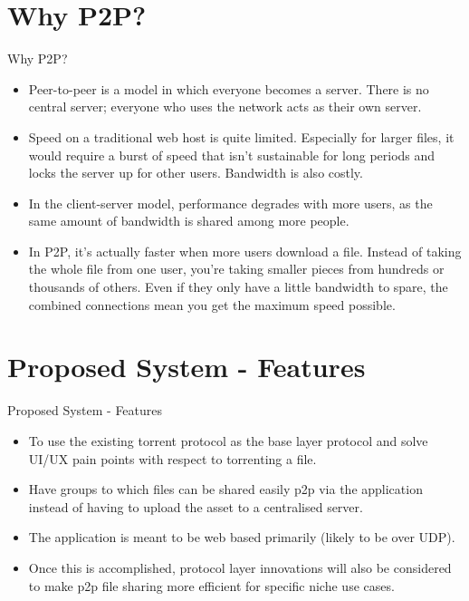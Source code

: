\documentclass[9pt]{beamer}
\begin{document}
\section{Why P2P?}
\begin{frame}{Why P2P?}
 \begin{itemize}
     \item Peer-to-peer is a model in which everyone becomes a server. There is no central server; everyone who uses the network acts as their own server. \item Speed on a traditional web host is quite limited. Especially for larger files, it would require a burst of speed that isn't sustainable for long periods and locks the server up for other users. Bandwidth is also costly. 
     \item In the client-server model, performance degrades with more users, as the same amount of bandwidth is shared among more people.
     \item In P2P, it's actually faster when more users download a file. Instead of taking the whole file from one user, you're taking smaller pieces from hundreds or thousands of others. Even if they only have a little bandwidth to spare, the combined connections mean you get the maximum speed possible. 
 \end{itemize}
    
\end{frame}


\section{Proposed System - Features }
\begin{frame}{Proposed System - Features }
 \begin{itemize}
     \item To use the existing torrent protocol as the base layer protocol and solve UI/UX pain points with respect to torrenting a file. 
     \item Have groups to which files can be shared easily p2p via the application instead of having to upload the asset to a centralised server.
     \item The application is meant to be web based primarily (likely to be over UDP).
     \item Once this is accomplished, protocol layer innovations will also be considered to make p2p file sharing more efficient for specific niche use cases.
 \end{itemize}
\end{frame}
\end{document}
